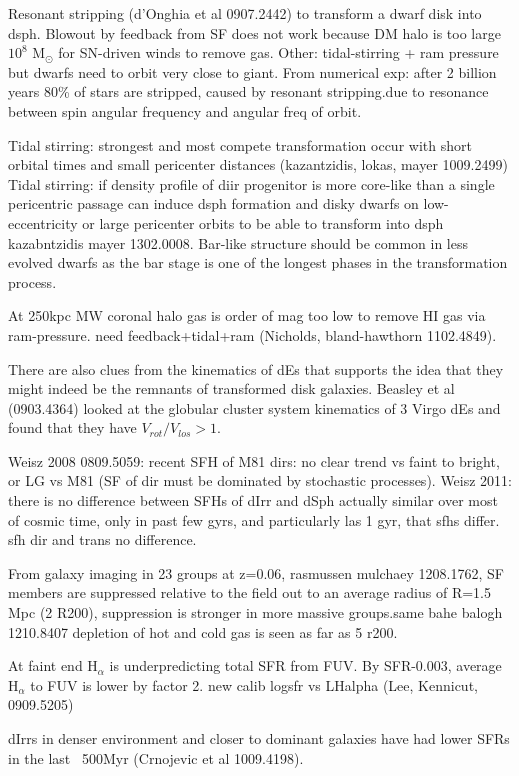 \documentclass[12pt,preprint]{emulateapj}
\begin{document}
Resonant stripping (d'Onghia et al 0907.2442) to transform a dwarf disk into dsph. Blowout by feedback from SF does not work because DM halo is too 
large $10^8$ M$_\odot$ for SN-driven winds to remove gas. Other: tidal-stirring + ram pressure but dwarfs need to orbit very close to giant. From numerical 
exp: after 2 billion years 80\% of stars are stripped, caused by resonant stripping.due to resonance between spin angular frequency and angular freq of orbit.

Tidal stirring: strongest and most compete transformation occur with short orbital times and small pericenter distances (kazantzidis, lokas, mayer 1009.2499)
Tidal stirring: if density profile of diir progenitor is more core-like than a single pericentric passage can induce dsph formation and disky dwarfs on low-eccentricity 
or large pericenter orbits to be able to transform into dsph kazabntzidis mayer 1302.0008. Bar-like structure should be common in less evolved dwarfs as the
bar stage is one of the longest phases in the transformation process.

At 250kpc MW coronal halo gas is order of mag too low to remove HI gas via ram-pressure. need feedback+tidal+ram (Nicholds, bland-hawthorn 1102.4849).

There are also clues from the kinematics of dEs that supports the idea that they might indeed be the remnants of transformed disk galaxies. Beasley et al 
(0903.4364) looked at the globular cluster system kinematics of 3 Virgo dEs and found that they have $V_{rot}/V_{los} > 1$.

Weisz 2008 0809.5059: recent SFH of M81 dirs: no clear trend vs faint to bright, or LG vs M81 (SF of dir must be dominated by stochastic processes).
Weisz 2011: there is no difference between SFHs of dIrr and dSph actually similar over most of cosmic time, only in past few gyrs, and particularly las 1 gyr, 
that sfhs differ. sfh dir and trans no difference.

From galaxy imaging in 23 groups at z=0.06, rasmussen mulchaey 1208.1762, SF members are suppressed relative to the field out to an average radius of 
R=1.5 Mpc (2 R200), suppression is stronger in more massive groups.same bahe balogh 1210.8407 depletion of hot and cold gas is seen as far as 5 r200.

At faint end H$_\alpha$ is underpredicting total SFR from FUV. By SFR-0.003, average H$_\alpha$ to FUV is lower by factor 2. new calib logsfr vs LHalpha 
(Lee, Kennicut, 0909.5205)

dIrrs in denser environment and closer to dominant galaxies have had lower SFRs in the last ~500Myr (Crnojevic et al 1009.4198).
\end{document}
